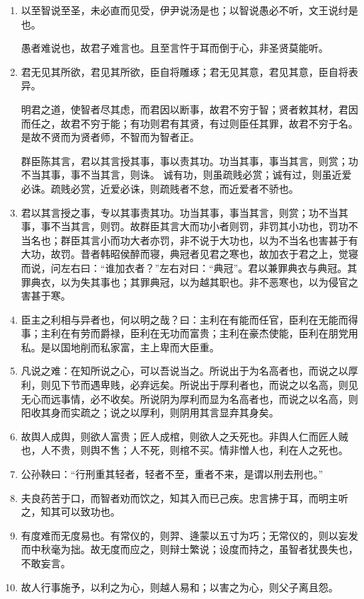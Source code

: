 \documentclass[UTF8]{ctexart}
\begin{document}
		
		\begin{enumerate}
			\item 以至智说至圣，未必直而见受，伊尹说汤是也；以智说愚必不听，文王说纣是也。
			
			愚者难说也，故君子难言也。且至言忤于耳而倒于心，非圣贤莫能听。
			\item 君无见其所欲，君见其所欲，臣自将雕琢；君无见其意，君见其意，臣自将表异。
			
			明君之道，使智者尽其虑，而君因以断事，故君不穷于智；贤者敕其材，君因而任之，故君不穷于能；有功则君有其贤，有过则臣任其罪，故君不穷于名。是故不贤而为贤者师，不智而为智者正。
			
			群臣陈其言，君以其言授其事，事以责其功。功当其事，事当其言，则赏；功不当其事，事不当其言，则诛。
			诚有功，则虽疏贱必赏；诚有过，则虽近爱必诛。疏贱必赏，近爱必诛，则疏贱者不怠，而近爱者不骄也。
			\item 君以其言授之事，专以其事责其功。功当其事，事当其言，则赏；功不当其事，事不当其言，则罚。故群臣其言大而功小者则罚，非罚其小功也，罚功不当名也；群臣其言小而功大者亦罚，非不说于大功也，以为不当名也害甚于有大功，故罚。昔者韩昭侯醉而寝，典冠者见君之寒也，故加衣于君之上，觉寝而说，问左右曰：“谁加衣者？”左右对曰：“典冠”。君以兼罪典衣与典冠。其罪典衣，以为失其事也；其罪典冠，以为越其职也。非不恶寒也，以为侵官之害甚于寒。
			\item 臣主之利相与异者也，何以明之哉？曰：主利在有能而任官，臣利在无能而得事；主利在有劳而爵禄，臣利在无功而富贵；主利在豪杰使能，臣利在朋党用私。是以国地削而私家富，主上卑而大臣重。
			\item 凡说之难：在知所说之心，可以吾说当之。所说出于为名高者也，而说之以厚利，则见下节而遇卑贱，必弃远矣。所说出于厚利者也，而说之以名高，则见无心而远事情，必不收矣。所说阴为厚利而显为名高者也，而说之以名高，则阳收其身而实疏之；说之以厚利，则阴用其言显弃其身矣。
			\item 故舆人成舆，则欲人富贵；匠人成棺，则欲人之夭死也。非舆人仁而匠人贼也，人不贵，则舆不售；人不死，则棺不买。情非憎人也，利在人之死也。
			\item 公孙鞅曰：“行刑重其轻者，轻者不至，重者不来，是谓以刑去刑也。”
			\item 夫良药苦于口，而智者劝而饮之，知其入而已己疾。忠言拂于耳，而明主听之，知其可以致功也。
			\item 有度难而无度易也。有常仪的，则羿、逄蒙以五寸为巧；无常仪的，则以妄发而中秋毫为拙。故无度而应之，则辩士繁说；设度而持之，虽智者犹畏失也，不敢妄言。
			\item 故人行事施予，以利之为心，则越人易和；以害之为心，则父子离且怨。

\end{enumerate}
\end{document}
